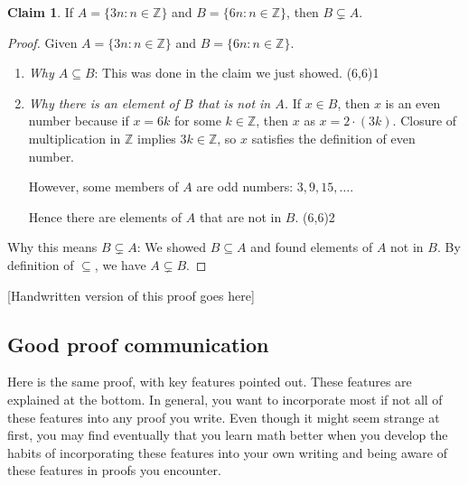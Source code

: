 \documentclass[11pt]{article}
\newcommand{\Z}{\mathbb{Z}}
\renewcommand\subset\subseteq
\newcommand\st{:}
\theoremstyle{definition}
\newtheorem*{claim*}{Claim}
\newcommand\qedpart[1]{ \hfill \framebox(6,6){\tiny #1}}
\begin{document}
\begin{mdframed}
\begin{claim*}
If $A=\{ 3n \st n \in \Z\}$ and $B=\{ 6n \st n\in \Z\}$, then $B\subsetneq A$.
\end{claim*}
\begin{proof}
Given $A=\{ 3n \st n \in \Z\}$ and $B=\{ 6n \st n\in \Z\}$. 

\begin{enumerate}
\item {\it Why $A\subset B$}: This was done in the claim we just showed. \qedpart{1}

\item {\it Why there is an element of $B$ that is not in $A$.}
If $x\in B$, then $x$ is an even number because if $x=6k$ for some $k\in\Z$, then $x$ as $x=2\cdot (3k)$. Closure of multiplication in $\Z$ implies $3k\in \Z$, so $x$ satisfies the definition of even number. 

However, some members of $A$ are odd numbers: $3, 9, 15, \dots $. 

Hence there are elements of $A$ that are not in $B$. \qedpart{2}

\end{enumerate}
Why this means $B\subsetneq A$: We showed $B\subset A$ and found elements of $A$ not in $B$. By definition of $\subseteq$, we have $A\subsetneq B$.
\end{proof}
\end{mdframed}

\begin{mdframed}
{}
[Handwritten version of this proof goes here]
\end{mdframed}



\newpage
\subsection{Good proof communication}

Here is the same proof, with key features pointed out. These features are explained at the bottom. In general, you want to incorporate most if not all of these features into any proof you write. Even though it might seem strange at first, you may find eventually that you learn math better when you develop the habits of incorporating these features into your own writing and being aware of these features in proofs you encounter.
\end{document}
